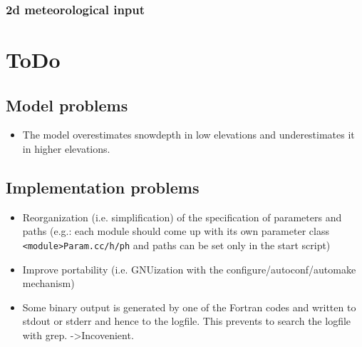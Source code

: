 \documentclass[12pt]{report}
\begin{document}
\subsection{2d meteorological input}
\chapter{ToDo}\label{ch:todo}


\section{Model problems}
\begin{itemize}
\item The model overestimates snowdepth in low elevations and
  underestimates it in higher elevations.
\end{itemize}

\section{Implementation problems}

\begin{itemize}
\item Reorganization (i.e. simplification) of the specification of
  parameters and paths (e.g.: each module should come up with its own
  parameter class \verb+<module>Param.cc/h/ph+ and paths can be set
  only in the start script)
\item Improve portability (i.e. GNUization with
  the configure/autoconf/automake mechanism)
\item Some binary output is generated by one of the Fortran codes and
  written to stdout or stderr and hence to the logfile. This prevents
  to search the logfile with grep.  ->Incovenient.
\end{itemize}
\end{document}
